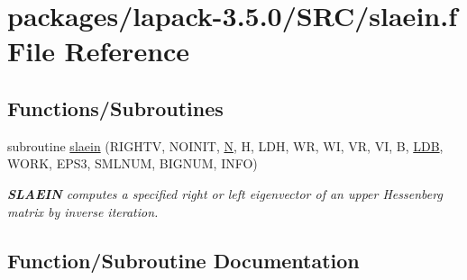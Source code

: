 \hypertarget{slaein_8f}{}\section{packages/lapack-\/3.5.0/\+S\+R\+C/slaein.f File Reference}
\label{slaein_8f}
\subsection*{Functions/\+Subroutines}
\begin{DoxyCompactItemize}
\item 
subroutine \hyperlink{slaein_8f_a55868b80b17a359be16b558c1e28abfd}{slaein} (R\+I\+G\+H\+T\+V, N\+O\+I\+N\+I\+T, \hyperlink{polmisc_8c_a0240ac851181b84ac374872dc5434ee4}{N}, H, L\+D\+H, W\+R, W\+I, V\+R, V\+I, B, \hyperlink{example__user_8c_a50e90a7104df172b5a89a06c47fcca04}{L\+D\+B}, W\+O\+R\+K, E\+P\+S3, S\+M\+L\+N\+U\+M, B\+I\+G\+N\+U\+M, I\+N\+F\+O)
\begin{DoxyCompactList}\small\item\em {\bfseries S\+L\+A\+E\+I\+N} computes a specified right or left eigenvector of an upper Hessenberg matrix by inverse iteration. \end{DoxyCompactList}\end{DoxyCompactItemize}


\subsection{Function/\+Subroutine Documentation}
\hypertarget{slaein_8f_a55868b80b17a359be16b558c1e28abfd}{}
